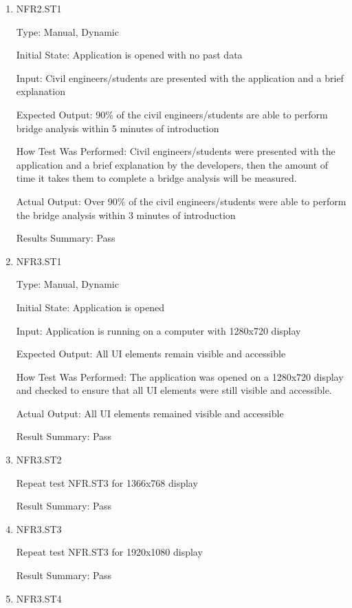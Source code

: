 \documentclass[12pt, titlepage]{article}
\begin{document}
\begin{enumerate}

\item{NFR2.ST1\\}

Type: Manual, Dynamic

Initial State: Application is opened with no past data

Input: Civil engineers/students are presented with the application and a brief explanation

Expected Output: 90\% of the civil engineers/students are able to perform bridge analysis within 5 minutes of introduction

How Test Was Performed: Civil engineers/students were presented with the application and a brief explanation by the developers, then the amount of time it takes them to complete a bridge analysis will be measured.

Actual Output: Over 90\% of the civil engineers/students were able to perform the bridge analysis within 3 minutes of introduction

Results Summary: Pass

\item{NFR3.ST1\\}

Type: Manual, Dynamic

Initial State: Application is opened

Input: Application is running on a computer with 1280x720 display

Expected Output: All UI elements remain visible and accessible

How Test Was Performed: The application was opened on a 1280x720 display and checked to ensure that all UI elements were still visible and accessible.

Actual Output: All UI elements remained visible and accessible

Result Summary: Pass

\item{NFR3.ST2\\}

Repeat test NFR.ST3 for 1366x768 display

Result Summary: Pass

\item{NFR3.ST3\\}

Repeat test NFR.ST3 for 1920x1080 display

Result Summary: Pass

\item{NFR3.ST4\\}


\end{enumerate}
\end{document}

